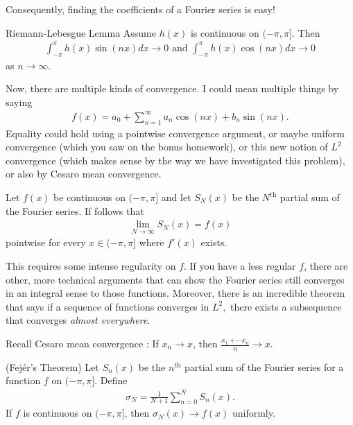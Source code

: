 \documentclass{ximera}
\begin{document}
Consequently, finding the coefficients of a Fourier series is easy!

\begin{theorem}{Riemann-Lebesgue Lemma}
    Assume $h(x)$ is continuous on $(-\pi,\pi]$.  Then
    \begin{align*}
        \int_{-\pi}^\pi h(x) \sin (nx) dx \to 0 \text{ and }\int_{-\pi}^\pi h(x) \cos (nx) dx \to 0 
    \end{align*}
    as $n \to \infty.$
\end{theorem}

Now, there are multiple kinds of convergence.  I could mean multiple things by saying 
\begin{align*}
    f(x) = a_0 + \sum\limits_{n=1}^\infty a_n \cos(nx) + b_n \sin(nx).
\end{align*}
Equality could hold using a pointwise convergence argument, or maybe uniform convergence (which you saw on the bonus homework), or this new notion of $L^2$ convergence (which makes sense by the way we have investigated this problem), or also by Cesaro mean convergence.  

\begin{theorem}
    Let $f(x)$ be continuous on $(-\pi,\pi]$ and let $S_N(x)$ be the $N^{\text{th}}$ partial sum of the Fourier series.  If follows that 
    \begin{align*}
        \lim\limits_{N\to\infty}S_N(x) =f(x)
    \end{align*}
    pointwise for every $x \in (-\pi,\pi]$ where $f'(x)$ exists.
\end{theorem}

This requires some intense regularity on $f$.  If you have a less regular $f$, there are other, more technical arguments that can show the Fourier series still converges in an integral sense to those functions.  Moreover, there is an incredible theorem that says if a sequence of functions converges in $L^2,$ there exists a subsequence that converges \textit{almost everywhere}. 

Recall Cesaro mean convergence :
If $x_n \to x$, then $\frac{x_1+ \cdots x_n}n \to x$.

\begin{theorem}{(Fej{\'e}r's Theorem)}
Let $S_n(x)$ be the $n^{\text{th}}$ partial sum of the Fourier series for a function $f$ on $(-\pi,\pi]$.  Define
\begin{align*}
    \sigma_N = \frac{1}{N+1} \sum\limits_{n=0}^N S_n(x).
\end{align*}
If $f$ is continuous on $(-\pi,\pi]$, then $\sigma_N(x) \to f(x)$ uniformly.
\end{theorem}
\end{document}
